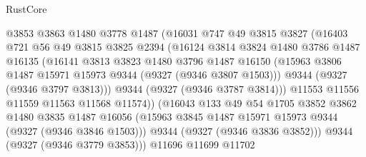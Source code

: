 \begin{lexlean}{RustCore}
\begin{coremodule}
                          @3853
                          @3863
                          @1480
                          @3778
                          @1487
                          (@16031
                            @747
                            @49
                            @3815
                            @3827
                            (@16403
                              @721
                              @56
                              @49
                              @3815
                              @3825
                              @2394
                              (@16124
                                @3814
                                @3824
                                @1480
                                @3786
                                @1487
                                @16135
                                (@16141
                                  @3813
                                  @3823
                                  @1480
                                  @3796
                                  @1487
                                  @16150
                                  (@15963
                                    @3806
                                    @1487
                                    @15971
                                    @15973
                                    @9344
                                    (@9327 (@9346 @3807 @1503)))
                                  @9344
                                  (@9327 (@9346 @3797 @3813)))
                                @9344
                                (@9327 (@9346 @3787 @3814)))
                              @11553
                              @11556
                              @11559
                              @11563
                              @11568
                              @11574))
                          (@16043
                            @133
                            @49
                            @54
                            @1705
                            @3852
                            @3862
                            @1480
                            @3835
                            @1487
                            @16056
                            (@15963 @3845 @1487 @15971 @15973 @9344 (@9327 (@9346 @3846 @1503)))
                            @9344
                            (@9327 (@9346 @3836 @3852)))
                          @9344
                          (@9327 (@9346 @3779 @3853)))
                        @11696
                        @11699
                        @11702

\end{coremodule}
\end{lexlean}
